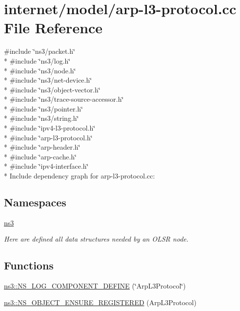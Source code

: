 \hypertarget{arp-l3-protocol_8cc}{}\section{internet/model/arp-\/l3-\/protocol.cc File Reference}
\label{arp-l3-protocol_8cc}
{\ttfamily \#include \char`\"{}ns3/packet.\+h\char`\"{}}\\*
{\ttfamily \#include \char`\"{}ns3/log.\+h\char`\"{}}\\*
{\ttfamily \#include \char`\"{}ns3/node.\+h\char`\"{}}\\*
{\ttfamily \#include \char`\"{}ns3/net-\/device.\+h\char`\"{}}\\*
{\ttfamily \#include \char`\"{}ns3/object-\/vector.\+h\char`\"{}}\\*
{\ttfamily \#include \char`\"{}ns3/trace-\/source-\/accessor.\+h\char`\"{}}\\*
{\ttfamily \#include \char`\"{}ns3/pointer.\+h\char`\"{}}\\*
{\ttfamily \#include \char`\"{}ns3/string.\+h\char`\"{}}\\*
{\ttfamily \#include \char`\"{}ipv4-\/l3-\/protocol.\+h\char`\"{}}\\*
{\ttfamily \#include \char`\"{}arp-\/l3-\/protocol.\+h\char`\"{}}\\*
{\ttfamily \#include \char`\"{}arp-\/header.\+h\char`\"{}}\\*
{\ttfamily \#include \char`\"{}arp-\/cache.\+h\char`\"{}}\\*
{\ttfamily \#include \char`\"{}ipv4-\/interface.\+h\char`\"{}}\\*
Include dependency graph for arp-\/l3-\/protocol.cc\+:
\subsection*{Namespaces}
\begin{DoxyCompactItemize}
\item 
 \hyperlink{namespacens3}{ns3}
\begin{DoxyCompactList}\small\item\em Here are defined all data structures needed by an O\+L\+SR node. \end{DoxyCompactList}\end{DoxyCompactItemize}
\subsection*{Functions}
\begin{DoxyCompactItemize}
\item 
\hyperlink{namespacens3_adcd6463bd1cf81e0bb813dab5e734282}{ns3\+::\+N\+S\+\_\+\+L\+O\+G\+\_\+\+C\+O\+M\+P\+O\+N\+E\+N\+T\+\_\+\+D\+E\+F\+I\+NE} (\char`\"{}Arp\+L3\+Protocol\char`\"{})
\item 
\hyperlink{namespacens3_ae15e53c6de5401e87d01b4f39f3107e6}{ns3\+::\+N\+S\+\_\+\+O\+B\+J\+E\+C\+T\+\_\+\+E\+N\+S\+U\+R\+E\+\_\+\+R\+E\+G\+I\+S\+T\+E\+R\+ED} (Arp\+L3\+Protocol)
\end{DoxyCompactItemize}
